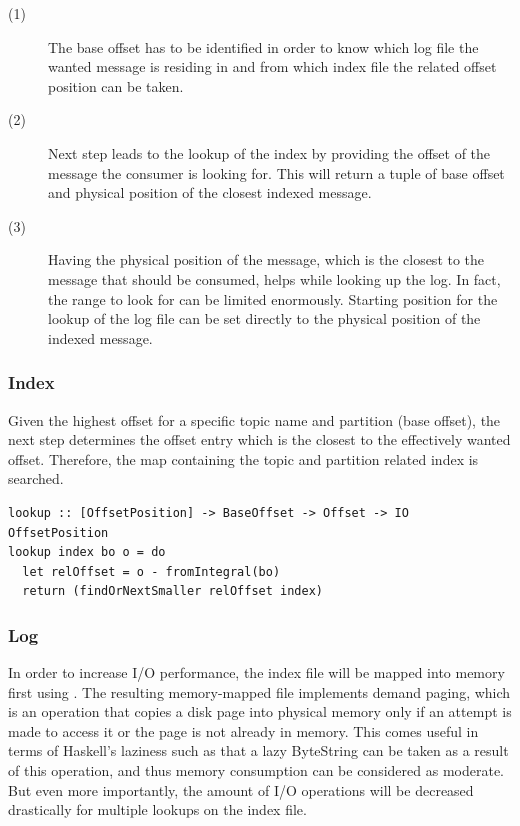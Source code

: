 \begin{description}
  \item[(1)]

    The base offset has to be identified in order to know which
    log file the wanted message is residing in and from which index file the
    related offset position can be taken.

  \item[(2)]

    Next step leads to the lookup of the index by providing the offset of the
    message the consumer is looking for. This will return a tuple of base offset
    and physical position of the closest indexed message.

  \item[(3)]

    Having the physical position of the message, which is the closest to the
    message that should be consumed, helps while looking up the log. In fact, the
    range to look for can be limited enormously. Starting position for the
    lookup of the log file can be set directly to the physical position of the
    indexed message.

\end{description}

\subsubsection{Index}

Given the highest offset for a specific topic name and partition (base offset), 
the next step determines the offset entry which is the closest to the
effectively wanted offset. Therefore, the map containing the topic and partition
related index is searched.

\begin{lstlisting}
lookup :: [OffsetPosition] -> BaseOffset -> Offset -> IO OffsetPosition
lookup index bo o = do
  let relOffset = o - fromIntegral(bo)
  return (findOrNextSmaller relOffset index)
\end{lstlisting}


\subsubsection{Log}

In order to increase I/O performance, the index file will be mapped into memory
first using . The
resulting memory-mapped file implements demand paging, which is an operation that
copies a disk page into physical memory only if an attempt is made to access it
or the page is not already in memory. This comes useful in terms of
Haskell's laziness such as that a lazy ByteString can be taken as a result of
this operation, and thus memory consumption can be considered as moderate. But
even more importantly, the amount of I/O operations will be decreased
drastically for multiple lookups on the index file. 

